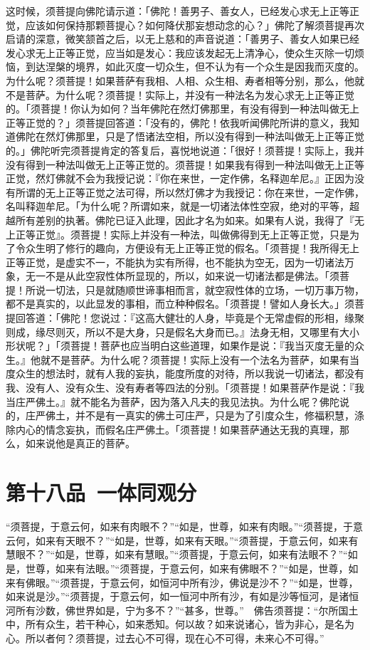 \documentclass[12pt,twoside,openany]{book}
\newcommand{\kai}[1]{{\CJKfamily{kai}#1}}
\begin{document}
\kai{这时候，须菩提向佛陀请示道：「佛陀！善男子、善女人，已经发心求无上正等正觉，应该如何保持那颗菩提心？如何降伏那妄想动念的心？」佛陀了解须菩提再次启请的深意，微笑颔首之后，以无上慈和的声音说道：「善男子、善女人如果已经发心求无上正等正觉，应当如是发心：我应该发起无上清净心，使众生灭除一切烦恼，到达涅槃的境界，如此灭度一切众生，但不认为有一个众生是因我而灭度的。为什么呢？须菩提！如果菩萨有我相、人相、众生相、寿者相等分别，那么，他就不是菩萨。为什么呢？须菩提！实际上，并没有一种法名为发心求无上正等正觉的。「须菩提！你认为如何？当年佛陀在然灯佛那里，有没有得到一种法叫做无上正等正觉的？」须菩提回答道：「没有的，佛陀！依我听闻佛陀所讲的意义，我知道佛陀在然灯佛那里，只是了悟诸法空相，所以没有得到一种法叫做无上正等正觉的。」佛陀听完须菩提肯定的答复后，喜悦地说道：「很好！须菩提！实际上，我并没有得到一种法叫做无上正等正觉的。须菩提！如果我有得到一种法叫做无上正等正觉，然灯佛就不会为我授记说：『你在来世，一定作佛，名释迦牟尼。』正因为没有所谓的无上正等正觉之法可得，所以然灯佛才为我授记：你在来世，一定作佛，名叫释迦牟尼。「为什么呢？所谓如来，就是一切诸法体性空寂，绝对的平等，超越所有差别的执著。佛陀已证入此理，因此才名为如来。如果有人说，我得了『无上正等正觉』。须菩提！实际上并没有一种法，叫做佛得到无上正等正觉，只是为了令众生明了修行的趣向，方便设有无上正等正觉的假名。「须菩提！我所得无上正等正觉，是虚实不一，不能执为实有所得，也不能执为空无，因为一切诸法万象，无一不是从此空寂性体所显现的，所以，如来说一切诸法都是佛法。「须菩提！所说一切法，只是就随顺世谛事相而言，就空寂性体的立场，一切万事万物，都不是真实的，以此显发的事相，而立种种假名。「须菩提！譬如人身长大。」须菩提回答道：「佛陀！您说过：『这高大健壮的人身，毕竟是个无常虚假的形相，缘聚则成，缘尽则灭，所以不是大身，只是假名大身而已。』法身无相，又哪里有大小形状呢？」「须菩提！菩萨也应当明白这些道理，如果作是说：『我当灭度无量的众生。』他就不是菩萨。为什么呢？须菩提！实际上没有一个法名为菩萨，如果有当度众生的想法时，就有人我的妄执，能度所度的对待，所以我说一切诸法，都没有我、没有人、没有众生、没有寿者等四法的分别。「须菩提！如果菩萨作是说：『我当庄严佛土。』就不能名为菩萨，因为落入凡夫的我见法执。为什么呢？佛陀说的，庄严佛土，并不是有一真实的佛土可庄严，只是为了引度众生，修福积慧，涤除内心的情念妄执，而假名庄严佛土。「须菩提！如果菩萨通达无我的真理，那么，如来说他是真正的菩萨。}

\chapter{第十八品\ 一体同观分}
“须菩提，于意云何，如来有肉眼不？”“如是，世尊，如来有肉眼。”“须菩提，于意云何，如来有天眼不？”“如是，世尊，如来有天眼。”“须菩提，于意云何，如来有慧眼不？”“如是，世尊，如来有慧眼。”“须菩提，于意云何，如来有法眼不？”“如是，世尊，如来有法眼。”“须菩提，于意云何，如来有佛眼不？”“如是，世尊，如来有佛眼。”“须菩提，于意云何，如恒河中所有沙，佛说是沙不？”“如是，世尊，如来说是沙。”“须菩提，于意云何，如一恒河中所有沙，有如是沙等恒河，是诸恒河所有沙数，佛世界如是，宁为多不？”“甚多，世尊。”　佛告须菩提：“尔所国土中，所有众生，若干种心，如来悉知。何以故？如来说诸心，皆为非心，是名为心。所以者何？须菩提，过去心不可得，现在心不可得，未来心不可得。”
\end{document}
